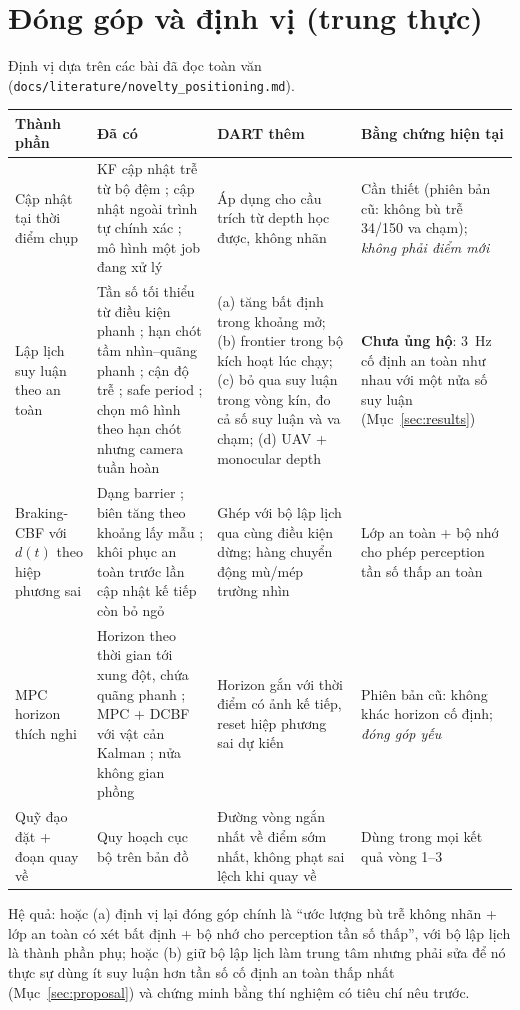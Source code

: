 \documentclass[11pt,a4paper]{article}
\numberwithin{equation}{section}
\newcommand{\code}[1]{\texttt{\small #1}}
\theoremstyle{definition}
\theoremstyle{plain}
\theoremstyle{remark}
\begin{document}
\section{Đóng góp và định vị (trung thực)}
\label{sec:contrib}
Định vị dựa trên các bài đã đọc toàn văn (\code{docs/literature/novelty\_positioning.md}).
\begin{center}\footnotesize
\begin{tabular}{@{}>{\raggedright\arraybackslash}p{3.0cm}>{\raggedright\arraybackslash}p{4.8cm}>{\raggedright\arraybackslash}p{3.8cm}>{\raggedright\arraybackslash}p{3.4cm}@{}}
\toprule
Thành phần & Đã có & DART thêm & Bằng chứng hiện tại \\ \midrule
Cập nhật tại thời điểm chụp & KF cập nhật trễ từ bộ đệm \cite{wickramasuriya2026}; cập nhật ngoài trình tự chính xác \cite{barshalom2002oosm,garcia2021oos}; mô hình một job đang xử lý \cite{aldana2023} & Áp dụng cho cầu trích từ depth học được, không nhãn & Cần thiết (phiên bản cũ: không bù trễ 34/150 va chạm); \emph{không phải điểm mới} \\
Lập lịch suy luận theo an toàn & Tần số tối thiểu từ điều kiện phanh \cite{hsiao2022zhuyi}; hạn chót tầm nhìn--quãng phanh \cite{boroujerdian2021roborun}; cận độ trễ \cite{falanga2019fast}; safe period \cite{yang2019selftrig}; chọn mô hình theo hạn chót nhưng camera tuần hoàn \cite{gog2022d3,pant2021anytime} & (a) tăng bất định trong khoảng mở; (b) frontier trong bộ kích hoạt lúc chạy; (c) bỏ qua suy luận trong vòng kín, đo cả số suy luận và va chạm; (d) UAV + monocular depth & \textbf{Chưa ủng hộ}: 3~Hz cố định an toàn như nhau với một nửa số suy luận (Mục~\ref{sec:results}) \\
Braking-CBF với $d(t)$ theo hiệp phương sai & Dạng barrier \cite{wang2016hetero,wang2017tro}; biên tăng theo khoảng lấy mẫu \cite{breeden2022sampled}; khôi phục an toàn trước lần cập nhật kế tiếp còn bỏ ngỏ \cite{han2026rfs} & Ghép với bộ lập lịch qua cùng điều kiện dừng; hàng chuyển động mù/mép trường nhìn & Lớp an toàn + bộ nhớ cho phép perception tần số thấp an toàn \\
MPC horizon thích nghi & Horizon theo thời gian tới xung đột, chứa quãng phanh \cite{mumken2026}; MPC + DCBF với vật cản Kalman \cite{jian2022dcbf}; nửa không gian phồng \cite{zhu2019chance} & Horizon gắn với thời điểm có ảnh kế tiếp, reset hiệp phương sai dự kiến & Phiên bản cũ: không khác horizon cố định; \emph{đóng góp yếu} \\
Quỹ đạo đặt + đoạn quay về & Quy hoạch cục bộ trên bản đồ \cite{tordesillas2021faster} & Đường vòng ngắn nhất về điểm sớm nhất, không phạt sai lệch khi quay về & Dùng trong mọi kết quả vòng 1--3 \\
\bottomrule
\end{tabular}
\end{center}
Hệ quả: hoặc (a) định vị lại đóng góp chính là ``ước lượng bù trễ không nhãn + lớp an toàn có xét bất định + bộ nhớ cho perception tần số thấp'', với bộ lập lịch là thành phần phụ; hoặc (b) giữ bộ lập lịch làm trung tâm nhưng phải sửa để nó thực sự dùng ít suy luận hơn tần số cố định an toàn thấp nhất (Mục~\ref{sec:proposal}) và chứng minh bằng thí nghiệm có tiêu chí nêu trước.
\end{document}
